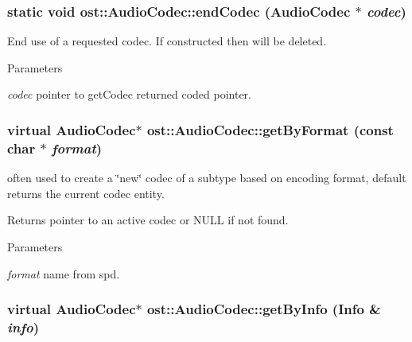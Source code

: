 \subsubsection[{endCodec}]{\setlength{\rightskip}{0pt plus 5cm}static void ost::AudioCodec::endCodec ({\bf AudioCodec} $\ast$ {\em codec})\hspace{0.3cm}{\ttfamily  [static]}}\label{classost_1_1_audio_codec_ad9c810876d4c61205d39e06a9b91e89a}


End use of a requested codec. If constructed then will be deleted.


\begin{DoxyParams}{Parameters}
\item[{\em codec}]pointer to getCodec returned coded pointer. \end{DoxyParams}
\subsubsection[{getByFormat}]{\setlength{\rightskip}{0pt plus 5cm}virtual {\bf AudioCodec}$\ast$ ost::AudioCodec::getByFormat (const char $\ast$ {\em format})\hspace{0.3cm}{\ttfamily  [inline, protected, virtual]}}\label{classost_1_1_audio_codec_ab82cde0fc2d640509eca21e4ef30ddee}


often used to create a \char`\"{}new\char`\"{} codec of a subtype based on encoding format, default returns the current codec entity. \begin{DoxyReturn}{Returns}
pointer to an active codec or NULL if not found. 
\end{DoxyReturn}

\begin{DoxyParams}{Parameters}
\item[{\em format}]name from spd. \end{DoxyParams}
\subsubsection[{getByInfo}]{\setlength{\rightskip}{0pt plus 5cm}virtual {\bf AudioCodec}$\ast$ ost::AudioCodec::getByInfo ({\bf Info} \& {\em info})\hspace{0.3cm}{\ttfamily  [inline, protected, virtual]}}\label{classost_1_1_audio_codec_ad68f933525fe820797b89aa1c91432af}


